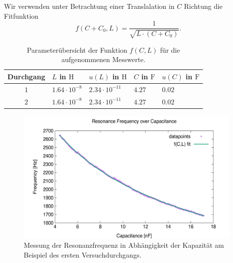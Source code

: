 \documentclass{article}
\begin{document}
    Wir verwenden unter Betrachtung einer Translalation in $C$ Richtung die Fitfunktion
    \[
        f(C + C_0,L) = \frac{1}{\sqrt{L\cdot (C + C_0)}}.
    \]

    \begin{table}[h]
        \centering
        \begin{tabular}{c|ll|ll}
             \textbf{Durchgang} & $L$ in $\si{\henry}$ & $u(L)$ in $\si{\henry}$ & $C$ in $\si{\farad}$ & $u(C)$ in $\si{\farad}$ \\
            \hline
            $1$ & $1.64\cdot 10^{-8}$ & $2.34\cdot 10^{-11}$ & $4.27$ & $0.02$ \\
            $2$ & $1.64\cdot 10^{-8}$ & $2.34\cdot 10^{-11}$ & $4.27$ & $0.02$ \\
        \end{tabular} 
        \caption{Parameterübersicht der Funktion $f(C,L)$ für die aufgenommenen Messwerte.}
    \end{table}


    \begin{figure}[H]
        \centering
        \includegraphics[width=11cm]{../Bilddateien/Messung1_Resonance_Freq_vs_Capacitance.png}
        \caption{Messung der Resonanzfrequenz in Abhängigkeit der Kapazität am Beispiel des ersten Versuchdurchgangs.}
    \end{figure}
\end{document}
